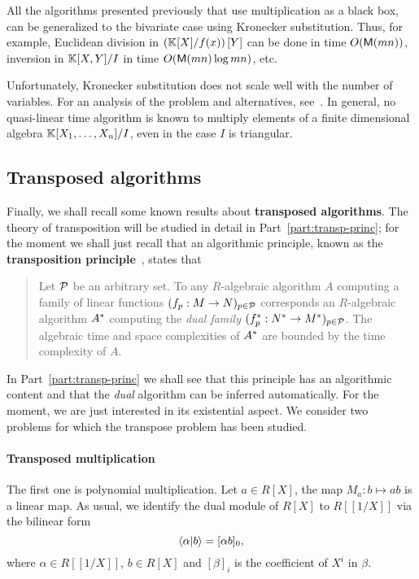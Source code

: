 All the algorithms presented previously that use multiplication as a
black box, can be generalized to the bivariate case using Kronecker
substitution. Thus, for example, Euclidean division in
$\left(\mathbb{K}[X]/f(x)\right)[Y]$ can be done in time $O(\mathsf{M}(mn))$,
inversion in $\mathbb{K}[X,Y]/I$ in time $O(\mathsf{M}(mn)\log mn)$, etc.

  Unfortunately,
Kronecker substitution does not scale well with the number of
variables. For an analysis of the problem and alternatives,
see~\cite{schost05,li+moreno+schost07}. In general, no quasi-linear
time algorithm is known to multiply elements of a finite dimensional
algebra $\mathbb{K}[X_1,\ldots,X_n]/I$, even in the case $I$ is triangular.


\subsection{Transposed algorithms}
\label{sec:transp-algor}
Finally, we shall recall some known results about
\textbf{transposed algorithms}. The theory
of transposition will be studied in detail in
Part~\ref{part:transp-princ}; for the moment we shall just recall that
an algorithmic principle, known as the
\textbf{transposition
  principle}~\cite{shoup94,shoup95,shoup99,Ka2K,hanrot+quercia+zimmermann,bostan+lecerf+schost:tellegen},
states that
\begin{quote}
  Let $\mathcal{P}$ be an arbitrary set. To any $R$-algebraic algorithm
  $A$ computing a family of linear functions $(f_p:M\rightarrow
  N)_{p\in\mathcal{P}}$ corresponds an $R$-algebraic algorithm $A^\ast$
  computing the \emph{dual family}
  $(f^\ast_p:N^\ast\rightarrow M^\ast)_{p\in\mathcal{P}}$. The algebraic time
  and space complexities of $A^\ast$ are bounded by the time
  complexity of $A$.
\end{quote}

In Part~\ref{part:transp-princ} we shall see that this principle has
an algorithmic content and that the \emph{dual} algorithm can be
inferred automatically. For the moment, we are just interested in its
existential aspect. We consider two problems for which the transpose
problem has been studied.

\paragraph{Transposed multiplication}
\label{sec:transp-mult}
The first one is polynomial
multiplication. Let $a\in R[X]$, the map $M_a:b\mapsto ab$ is a linear
map. As usual, we identify the dual module of $R[X]$ to $R[[1/X]]$ via
the bilinear form
\begin{equation}
  \label{eq:276}
  \left\langle \alpha \middle| b \right\rangle = [\alpha b]_0
  \text{,}
\end{equation}
where $\alpha\in R[[1/X]]$, $b\in R[X]$ and
$[\beta]_i$ is the coefficient of
$X^i$ in $\beta$.

